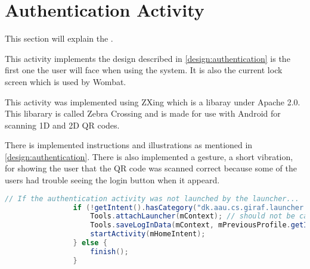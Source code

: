 \section{Authentication Activity}
This section will explain the .

This activity implements the design described in \autoref{design:authentication} is the first one the user will face when using the \giraf[] system. It is also the current lock screen which is used by Wombat. 

This activity was implemented using ZXing which is a libaray under Apache 2.0. This libarary is called Zebra Crossing and is made for use with Android for scanning 1D and 2D QR codes.

There is implemented instructions and illustrations as mentioned in \autoref{design:authentication}. There is also implemented a gesture, a short vibration, for showing the user that the QR code was scanned correct because some of the users had trouble seeing the login button when it appeard.

\begin{lstlisting}[style=sourceCode, language=JAVA, caption=This is code, label=lst:authenticationAcitivity] 
				// If the authentication activity was not launched by the launcher...
				if (!getIntent().hasCategory("dk.aau.cs.giraf.launcher.GIRAF")) {
					Tools.attachLauncher(mContext); // should not be called
					Tools.saveLogInData(mContext, mPreviousProfile.getId());
					startActivity(mHomeIntent);
				} else {
					finish();
				}
\end{lstlisting}
